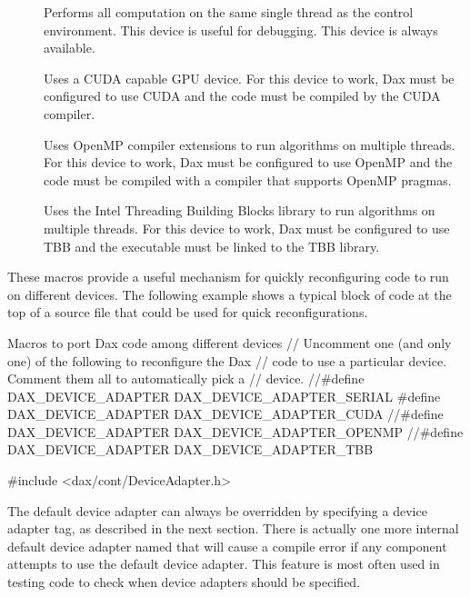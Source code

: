 \begin{description}
\item[] Performs all computation on
  the same single thread as the control environment. This device is useful
  for debugging. This device is always available.
\item[] Uses a CUDA capable GPU
  device. For this device to work, Dax must be configured to use CUDA and
  the code must be compiled by the CUDA  compiler.
\item[] Uses OpenMP compiler
  extensions to run algorithms on multiple threads. For this device to
  work, Dax must be configured to use OpenMP and the code must be compiled
  with a compiler that supports OpenMP pragmas.
\item[] Uses the Intel Threading
  Building Blocks library to run algorithms on multiple threads. For this
  device to work, Dax must be configured to use TBB and the executable must
  be linked to the TBB library.
\end{description}

These macros provide a useful mechanism for quickly reconfiguring code to
run on different devices. The following example shows a typical block of
code at the top of a source file that could be used for quick
reconfigurations.

\begin{daxexample}{Macros to port Dax code among different devices}
// Uncomment one (and only one) of the following to reconfigure the Dax
// code to use a particular device. Comment them all to automatically pick a
// device.
//#define DAX_DEVICE_ADAPTER DAX_DEVICE_ADAPTER_SERIAL
#define DAX_DEVICE_ADAPTER DAX_DEVICE_ADAPTER_CUDA
//#define DAX_DEVICE_ADAPTER DAX_DEVICE_ADAPTER_OPENMP
//#define DAX_DEVICE_ADAPTER DAX_DEVICE_ADAPTER_TBB

#include <dax/cont/DeviceAdapter.h>
\end{daxexample}

The default device adapter can always be overridden by specifying a device
adapter tag, as described in the next section. There is actually one more
internal default device adapter named
 that will cause a compile error if
any component attempts to use the default device adapter. This feature is
most often used in testing code to check when device adapters should be
specified.

